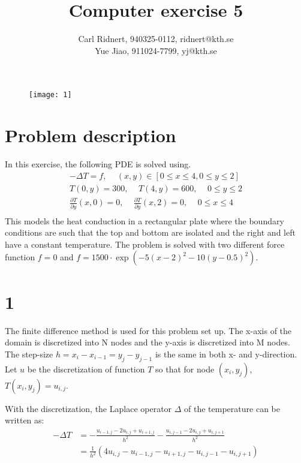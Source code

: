 \documentclass[11pt,a4paper,roman]{scrartcl}
\title{Computer exercise 5}
\date{}
\author{Carl Ridnert, 940325-0112, ridnert@kth.se \\
Yue Jiao, 911024-7799, yj@kth.se}
\begin{document}
\maketitle
\begin{figure}[h]
\centering
\texttt{[image: 1]}
\end{figure}
\newpage

\section*{Problem description}
In this exercise, the following PDE is solved using.
\begin{equation}
\begin{aligned}
-\Delta T = f\textrm{, } \quad (x,y) \in [0\leq x \leq 4, 0 \leq y \leq 2 ] \\
T(0,y)=300 \textrm{, } \quad T(4,y)=600 \textrm{, } \quad 0 \leq y \leq 2 \\
\frac{\partial T}{\partial y}(x,0)=0 \textrm{, } \quad \frac{\partial T}{\partial y}(x,2)=0 \textrm{, } \quad 0 \leq x \leq 4 \\
\end{aligned}
\end{equation}
This models the heat conduction in a rectangular plate where the boundary conditions are such that the top and bottom are isolated and the right and left have a constant temperature. The problem is solved with two different force function $f=0$ and $f=1500\cdot \exp(-5(x-2)^2-10(y-0.5)^2)$.

\section*{1}
The finite difference method is used for this problem set up. The x-axis of the domain is discretized into N nodes and the y-axis is discretized into M nodes. The step-size $h=x_i-x_{i-1}=y_j-y_{j-1}$ is the same in both x- and y-direction. Let $u$ be the discretization of function $T$ so that for node $(x_i, y_j)$, $T(x_i, y_j) = u_{i,j}$. 

With the discretization, the Laplace operator $\Delta$ of the temperature can be written as: 
\begin{equation}
\begin{aligned}
-\Delta T & = -\frac{u_{i-1,j} - 2u_{i,j} + u_{i+1,j}}{h^2}-\frac{u_{i,j-1} - 2u_{i,j} + u_{i,j+1}}{h^2} \\
& = \frac{1}{h^2}\left( 4u_{i,j} - u_{i-1,j} - u_{i+1,j} - u_{i,j-1} - u_{i,j+1} \right)
\end{aligned}
\end{equation}
\end{document}
